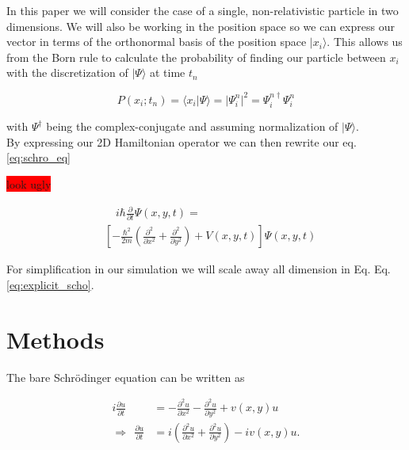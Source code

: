 \documentclass[english,notitlepage,reprint,nofootinbib]{revtex4-2}  %
\begin{document}
	
	In this paper we will consider the case of a single, non-relativistic particle in two dimensions.
	We will also be working in the position space so we can express our vector
	in terms of the orthonormal basis of the position space $|x_i\rangle$. This allows us 
	from the Born rule to calculate the probability of finding our particle between 
	$x_i$ with the discretization of  $|\Psi\rangle$  at time $t_n$
	
	\begin{equation}
		P(x_i;t_n) = \langle x_i |\Psi\rangle = |\Psi^n_i|^2 =  \Psi^{n\dagger}_i\Psi^n_i
	\end{equation}
	
	with $\Psi^\dagger$ being the complex-conjugate and assuming normalization of $
	|\Psi\rangle$. \\
	
	By expressing our 2D Hamiltonian operator we can then rewrite our eq. \ref{eq:schro_eq} 
	
	
	\colorbox{red}{look ugly}
	
	\begin{align*}
		& \quad i \hbar \frac{\partial}{\partial t} \Psi(x, y, t)= \\
		& \left[-\frac{\hbar^{2}}{2 m}\left(\frac{\partial^{2}}{\partial x^{2}}+\frac{\partial^{2}}{\partial y^{2}}\right)+V(x, y, t)\right] \Psi(x, y, t) \tag{2} \label{eq:explicit_scho}
	\end{align*}
	
	
	For simplification in our simulation we will scale away all dimension in Eq.
	Eq. \ref{eq:explicit_scho}. 
	
	
	\section{Methods}\label{sec:methods}
	The bare Schrödinger equation can be written as 

	\begin{equation}\label{eq:bare Schrodinger}
		\begin{split}
		i \frac{\partial u}{\partial t} &= -\frac{\partial^2 u}{\partial x^2} - \frac{\partial^2 u}{\partial y^2} + v(x,y) u\\
		\Rightarrow \ \ \frac{\partial u}{\partial t} &= i\left(\frac{\partial^2 u}{\partial x^2} + \frac{\partial^2 u}{\partial y^2}\right) - iv(x,y) u.
		\end{split}
	\end{equation} 
	
\end{document}
